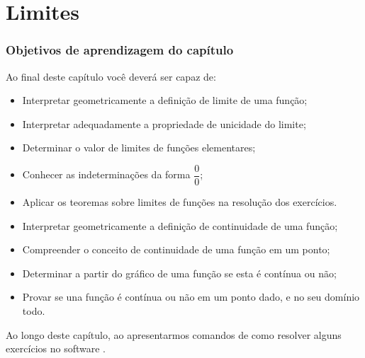 \cleardoublepage\documentclass[../main.tex]{subfiles}
\begin{document}
\chapter{Limites}\label{cap:limites}\vspace{-0.3cm}
\minitoc
\subsection*{Objetivos de aprendizagem do capítulo}
Ao final deste capítulo você deverá ser capaz de:
\begin{itemize}
    \item Interpretar geometricamente a definição de limite de uma função;
    \item Interpretar adequadamente a propriedade de unicidade do limite;
\item Determinar o valor de limites de funções elementares;
\item Conhecer as indeterminações da forma \(\dfrac{0}{0}\);
\item Aplicar os teoremas sobre limites de funções na resolução dos exercícios.
\item Interpretar geometricamente a definição de continuidade de uma função;
\item Compreender o conceito de continuidade de uma função em um ponto;
\item Determinar a partir do gráfico de uma função se esta é contínua ou não;
\item Provar se una função é contínua ou não em um ponto dado, e no seu domínio todo.
\end{itemize}
\begin{obs}
Ao longo deste capítulo, ao apresentarmos comandos de como resolver alguns exercícios no software \geogebra{}.
\end{obs}\vspace{-0.5cm}
\end{document}
